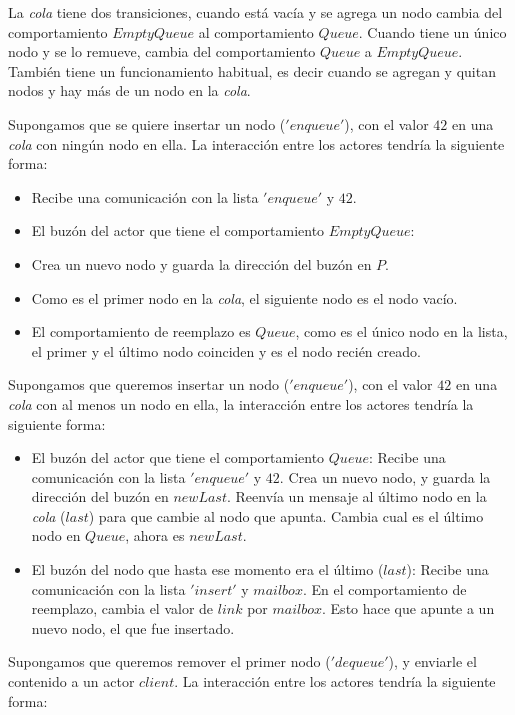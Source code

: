 La \textit{cola} tiene dos transiciones, cuando está vacía y se agrega un nodo cambia del comportamiento $EmptyQueue$ al comportamiento $Queue$. Cuando tiene un único nodo y se lo remueve, cambia del comportamiento $Queue$ a $EmptyQueue$. También tiene un funcionamiento habitual, es decir cuando se agregan y quitan nodos y hay más de un nodo en la \textit{cola}.

Supongamos que se quiere insertar un nodo ($'enqueue'$), con el valor $42$ en una \textit{cola} con ningún nodo en ella. La interacción entre los actores tendría la siguiente forma:

\begin{itemize}
 \item Recibe una comunicación con la lista $'enqueue'$ y $42$.
 \item El buzón del actor que tiene el comportamiento $EmptyQueue$:
 \item Crea un nuevo nodo y guarda la dirección del buzón en $P$.
 \item Como es el primer nodo en la \textit{cola}, el siguiente nodo es el nodo vacío.
 \item El comportamiento de reemplazo es $Queue$, como es el único nodo en la lista, el primer y el último nodo coinciden y es el nodo recién creado.
\end{itemize}

Supongamos que queremos insertar un nodo ($'enqueue'$), con el valor $42$ en una \textit{cola} con al menos un nodo en ella, la interacción entre los actores tendría la siguiente forma:

\begin{itemize}
 \item El buzón del actor que tiene el comportamiento $Queue$:
 \subitem Recibe una comunicación con la lista $'enqueue'$ y $42$.
 \subitem Crea un nuevo nodo, y guarda la dirección del buzón en $newLast$.
 \subitem Reenvía un mensaje al último nodo en la \textit{cola} ($last$) para que cambie al nodo que apunta.
 \subitem Cambia cual es el último nodo en $Queue$, ahora es $newLast$.
 \item El buzón del nodo que hasta ese momento era el último ($last$):
 \subitem Recibe una comunicación con la lista $'insert'$ y $mailbox$.
 \subitem En el comportamiento de reemplazo, cambia el valor de $link$ por $mailbox$. Esto hace que apunte a un nuevo nodo, el que fue insertado.
\end{itemize}

Supongamos que queremos remover el primer nodo ($'dequeue'$), y enviarle el contenido a un actor $client$. La interacción entre los actores tendría la siguiente forma:

